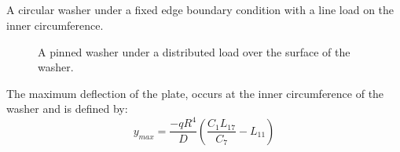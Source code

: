 \documentclass[10pt,letterpaper]{report}
\numberwithin{equation}{chapter}
\begin{document}
\subsection{}
\label{subsec:pwd} %
A circular washer under a fixed edge boundary condition with a line load on the inner circumference.
\begin{figure}[!ht]
\centering
\label{fig:pwd}
    \hfill
    \caption{A pinned washer under a distributed load over the surface of the washer.}
    \label{fig:dummy}
\end{figure}
The maximum deflection of the plate, occurs at the inner circumference of the washer and is defined by:
\[y_{max}=\frac{-q R^4}{D}\left(\frac{C_1 L_{17}}{C_7} - L_{11}\right)\]

\end{document}
